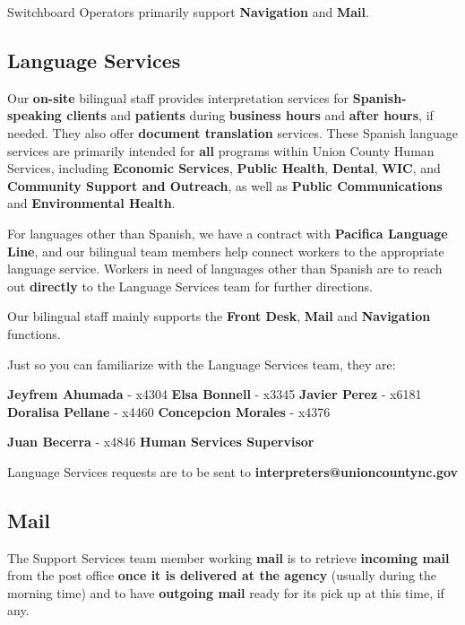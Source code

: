 \documentclass{article}
\begin{document}
Switchboard Operators primarily support \textbf{Navigation} and \textbf{Mail}.

\subsection{Language Services}
Our \textbf{on-site} bilingual staff provides interpretation services for \textbf{Spanish-speaking clients} and \textbf{patients} during \textbf{business hours} and \textbf{after hours}, if needed. They also offer \textbf{document translation} services. These Spanish language services are primarily intended for \textbf{all} programs within Union County Human Services, including \textbf{Economic Services}, \textbf{Public Health}, \textbf{Dental}, \textbf{WIC}, and \textbf{Community Support and Outreach}, as well as \textbf{Public Communications} and \textbf{Environmental Health}. 

For languages other than Spanish, we have a contract with \textbf{Pacifica Language Line}, and our bilingual team members help connect workers to the appropriate language service. Workers in need of languages other than Spanish are to reach out \textbf{directly} to the Language Services team for further directions.

Our bilingual staff mainly supports the \textbf{Front Desk}, \textbf{Mail} and \textbf{Navigation} functions.

Just so you can familiarize with the Language Services team, they are:

\textbf{Jeyfrem Ahumada} - x4304 \newline
\textbf{Elsa Bonnell} - x3345 \newline
\textbf{Javier Perez} - x6181 \newline
\textbf{Doralisa Pellane} - x4460 \newline
\textbf{Concepcion Morales} - x4376 \newline

\textbf{Juan Becerra} - x4846 \textbf{Human Services Supervisor}

Language Services requests are to be sent to \textbf{interpreters@unioncountync.gov}

\subsection{Mail}
The Support Services team member working \textbf{mail} is to retrieve \textbf{incoming mail} from the post office \textbf{once it is delivered at the agency} (usually during the morning time) and to have \textbf{outgoing mail} ready for its pick up at this time, if any. 
\end{document}
